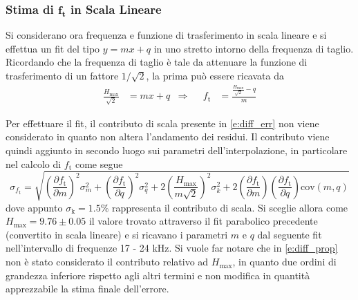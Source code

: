 \documentclass[a4paper,11pt]{article} %
\begin{document}
\subsubsection{Stima di $\mathbf{f_{\text{t}}}$ in Scala Lineare}

Si considerano ora frequenza e funzione di trasferimento in scala lineare e si effettua un fit del tipo $y = mx + q$ in
uno stretto intorno della frequenza di taglio. Ricordando che la frequenza di taglio è tale da attenuare la funzione di
trasferimento di un fattore $1/\sqrt{2}$, la prima può essere ricavata da
\begin{align}
	\frac{H_{\text{max}}}{\sqrt{2}}&=mx+q & \Longrightarrow & & f_{\text{t}}&=\frac{\frac{H_{\text{max}}}{\sqrt{2}}-q}{m}
\end{align}

\noindent Per effettuare il fit, il contributo di scala presente in \autoref{e:diff_err} non viene considerato in quanto
non altera l'andamento dei residui. Il contributo viene quindi aggiunto in secondo luogo sui parametri
dell’interpolazione, in particolare nel calcolo di $f_{\text{t}}$ come segue
\begin{equation}\label{e:diff_prop}
	\sigma_{f_{\text{t}}}=\sqrt{
		\left(
			\frac{\partial f_{\text{t}}}{\partial m}
		\right)^2\sigma_m^2+
		\left(
			\frac{\partial f_{\text{t}}}{\partial q}
		\right)^2\sigma_q^2+
		2\left(
			\frac{H_{\text{max}}}{m\sqrt{2}}
		\right)^2\sigma_k^2+
		2\left(
			\frac{\partial f_{\text{t}}}{\partial m}
		\right)
		\left(
			\frac{\partial f_{\text{t}}}{\partial q}
		\right)\text{cov}(m,q)
	}
\end{equation}
\noindent dove appunto $\sigma_{\text{k}}=1.5\%$ rappresenta il contributo di scala. Si sceglie allora come
$H_{\text{max}} = 9.76 \pm 0.05$ il valore trovato attraverso il fit parabolico precedente (convertito in scala lineare)
e si ricavano i parametri $m$ e $q$ dal seguente fit nell'intervallo di frequenze 17 - 24 kHz. Si vuole far notare che
in \autoref{e:diff_prop} non è stato considerato il contributo relativo ad $H_{\text{max}}$, in quanto due ordini di
grandezza inferiore rispetto agli altri termini e non modifica in quantità apprezzabile la stima finale dell'errore.
\end{document}
